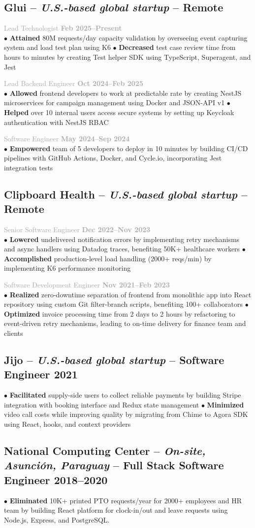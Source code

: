 \documentclass[10pt,a4paper]{article}
\newcommand{\actionverb}[1]{\textcolor{actioncolor}{\textbf{#1}}}
\newcommand{\cvcompany}[3]{
  \subsection{#1 \textcolor{mediumgray}{#2} \textcolor{mediumgray}{\footnotesize -- Remote}}
  #3
}
\newcommand{\cvrole}[3]{
  \normalsize{\textcolor{darkgray}{#1 \hfill {\bfseries\footnotesize\textcolor{mediumgray}{#2}}}}\\
  {\footnotesize #3}
}
\newcommand{\cvsinglecompany}[5]{
  \subsection{#1 \textcolor{mediumgray}{#2} -- \textbf{\small #3} \hfill {\footnotesize\textcolor{mediumgray}{#4}}}
  {\footnotesize #5}
  \vspace{0.2em}
}
\begin{document}
\cvcompany{Glui}{-- \textit{U.S.-based global startup}}{
	
  \cvrole{Lead Technologist}{Feb 2025--Present}{
$\bullet$ \actionverb{Attained} 80M requests/day capacity validation by overseeing event capturing system and load test plan using K6 $\bullet$ \actionverb{Decreased} test case review time from hours to minutes by creating Test helper SDK using TypeScript, Superagent, and Jest
  }
  
  \cvrole{Lead Backend Engineer}{Oct 2024--Feb 2025}{
$\bullet$ \actionverb{Allowed} frontend developers to work at predictable rate by creating NestJS microservices for campaign management using Docker and JSON-API v1 $\bullet$ \actionverb{Helped} over 10 internal users access secure systems by setting up Keycloak authentication with NestJS RBAC
  }
  
  \cvrole{Software Engineer}{May 2024--Sep 2024}{
$\bullet$ \actionverb{Empowered} team of 5 developers to deploy in 10 minutes by building CI/CD pipelines with GitHub Actions, Docker, and Cycle.io, incorporating Jest integration tests
  }
}

\cvcompany{Clipboard Health}{-- \textit{U.S.-based global startup}}{
  \cvrole{Senior Software Engineer}{Dec 2022--Nov 2023}{
$\bullet$ \actionverb{Lowered} undelivered notification errors by implementing retry mechanisms and async handlers using Datadog traces, benefiting 50K+ healthcare workers $\bullet$ \actionverb{Accomplished} production-level load handling (2000+ reqs/min) by implementing K6 performance monitoring
  }
  
  \cvrole{Software Development Engineer}{Nov 2021--Feb 2023}{
$\bullet$ \actionverb{Realized} zero-downtime separation of frontend from monolithic app into React repository using custom Git filter-branch scripts, benefiting 100+ collaborators $\bullet$ \actionverb{Optimized} invoice processing time from 2 days to 2 hours by refactoring to event-driven retry mechanisms, leading to on-time delivery for finance team and clients
  }
}

\cvsinglecompany{Jijo}{-- \textit{U.S.-based global startup}}{Software Engineer}{2021}{
$\bullet$ \actionverb{Facilitated} supply-side users to collect reliable payments by building Stripe integration with booking interface and Redux state management $\bullet$ \actionverb{Minimized} video call costs while improving quality by migrating from Chime to Agora SDK using React, hooks, and context providers
}

\cvsinglecompany{National Computing Center}{-- \textit{On-site, Asunción, Paraguay}}{Full Stack Software Engineer}{2018--2020}{
$\bullet$ \actionverb{Eliminated} 10K+ printed PTO requests/year for 2000+ employees and HR team by building React platform for clock-in/out and leave requests using Node.js, Express, and PostgreSQL.
}
\end{document}
